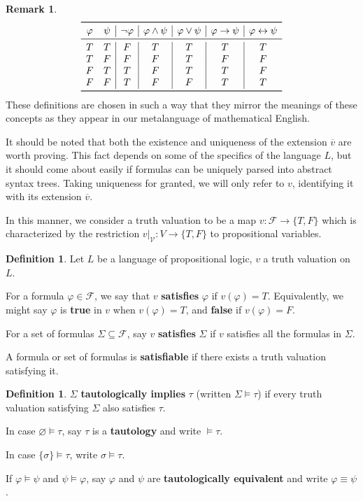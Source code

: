 \documentclass[12pt]{article}
\theoremstyle{definition}
\newtheorem{definition}[theorem]{Definition}
\newtheorem{remark}[theorem]{Remark}
\renewcommand{\phi}{\varphi}
\renewcommand{\emptyset}{\varnothing}
\newcommand{\<}{\langle}
\renewcommand{\>}{\rangle}
\newcommand{\clo}{\overline}
\newcommand{\seq}{\subseteq}
\newcommand{\FF}{\mathcal{F}}
\newcommand{\VV}{\mathcal{V}}
\newcommand{\keyword}{\textbf}
\newcommand{\liff}{\leftrightarrow}
\begin{document}
\begin{remark}
    \[
        \begin{array}{cc|c|c|c|c|c}
            \toprule
            \phi & \psi & \lnot\phi & \phi\land\psi & \phi\lor\psi & \phi\to\psi & \phi\liff\psi \\
            \midrule
            T & T & F & T & T & T & T \\
            T & F & F & F & T & F & F \\
            F & T & T & F & T & T & F \\
            F & F & T & F & F & T & T \\
            \bottomrule
        \end{array}
    \]
    These definitions are chosen in such a way that they mirror the meanings of these concepts as they appear in our metalanguage of mathematical English.

    It should be noted that both the existence and uniqueness of the extension $\clo{v}$ are worth proving.
    This fact depends on some of the specifics of the language $L$, but it should come about easily if formulas can be uniquely parsed into abstract syntax trees.
    Taking uniqueness for granted, we will only refer to $v$, identifying it with its extension $\clo{v}$.

    In this manner, we consider a truth valuation to be a map $v : \FF \to \{T, F\}$ which is characterized by the restriction $v|_\VV : V \to \{T, F\}$ to propositional variables.
\end{remark}

\begin{definition}
    Let $L$ be a language of propositional logic, $v$ a truth valuation on $L$.
    
    For a formula $\phi \in \FF$, we say that $v$ \keyword{satisfies} $\phi$ if $v(\phi) = T$.
    Equivalently, we might say $\phi$ is \keyword{true} in $v$ when $v(\phi) = T$, and \keyword{false} if $v(\phi) = F$.

    For a set of formulas $\Sigma \seq \FF$, say $v$ \keyword{satisfies} $\Sigma$ if $v$ satisfies all the formulas in $\Sigma$.

    A formula or set of formulas is \keyword{satisfiable} if there exists a truth valuation satisfying it.
\end{definition}

\begin{definition}
    $\Sigma$ \keyword{tautologically implies} $\tau$ (written $\Sigma \vDash \tau$) if every truth valuation satisfying $\Sigma$ also satisfies $\tau$.

    In case $\emptyset \vDash \tau$, say $\tau$ is a \keyword{tautology} and write $\vDash \tau$.

    In case $\{\sigma\} \vDash \tau$, write $\sigma \vDash \tau$.

    If $\phi \vDash \psi$ and $\psi \vDash \phi$, say $\phi$ and $\psi$ are \keyword{tautologically equivalent} and write $\phi \equiv \psi$.
\end{definition}
\end{document}
